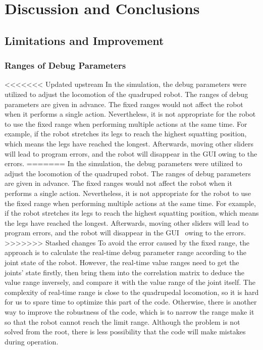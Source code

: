 \chapter{Discussion and Conclusions}


\section{Limitations and Improvement}
\subsection{Ranges of Debug Parameters}
<<<<<<< Updated upstream
In the simulation, the debug parameters were utilized to adjust the locomotion of the quadruped robot. The ranges of debug parameters are given in advance. The fixed ranges would not affect the robot when it performs a single action. Nevertheless, it is not appropriate for the robot to use the fixed range when performing multiple actions at the same time. For example, if the robot stretches its legs to reach the highest squatting position, which means the legs have reached the longest. Afterwards, moving other sliders will lead to program errors, and the robot will disappear in the GUI\cite{ref:GUI} owing to the errors. 
=======
In the simulation, the debug parameters were utilized to adjust the locomotion of the quadruped robot. The ranges of debug parameters are given in advance. The fixed ranges would not affect the robot when it performs a single action. Nevertheless, it is not appropriate for the robot to use the fixed range when performing multiple actions at the same time. For example, if the robot stretches its legs to reach the highest squatting position, which means the legs have reached the longest. Afterwards, moving other sliders will lead to program errors, and the robot will disappear in the GUI~\cite{ref:GUI} owing to the errors.
>>>>>>> Stashed changes
To avoid the error caused by the fixed range, the approach is to calculate the real-time debug parameter range according to the joint state of the robot. However, the real-time value ranges need to get the joints' state firstly, then bring them into the correlation matrix to deduce the value range inversely, and compare it with the value range of the joint itself. The complexity of real-time range is close to the quadrupedal locomotion, so it is hard for us to spare time to optimize this part of the code. Otherwise, there is another way to improve the robustness of the code, which is to narrow the range make it so that the robot cannot reach the limit range. Although the problem is not solved from the root, there is less possibility that the code will make mistakes during operation.

